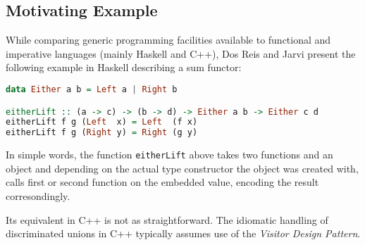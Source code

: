 \documentclass[preprint]{sigplanconf}
\DeclareRobustCommand{\code}[1]{{\lstinline[breaklines=false]{#1}}}
\begin{document}


\subsection{Motivating Example}

While comparing generic programming facilities available to functional and 
imperative languages (mainly Haskell and C++), Dos Reis and Jarvi present the 
following example in Haskell describing a sum functor\cite{DRJ05}:

\begin{lstlisting}[language=Haskell]
data Either a b = Left a | Right b

eitherLift :: (a -> c) -> (b -> d) -> Either a b -> Either c d
eitherLift f g (Left  x) = Left  (f x)
eitherLift f g (Right y) = Right (g y)
\end{lstlisting}

In simple words, the function \code{eitherLift} above takes two functions and an 
object and depending on the actual type constructor the object was created with, 
calls first or second function on the embedded value, encoding the result 
corresondingly.

Its equivalent in C++ is not as straightforward. The idiomatic handling of 
discriminated unions in C++ typically assumes use of the \emph{Visitor Design 
Pattern}\cite{DesignPatterns1993}.
\end{document}
